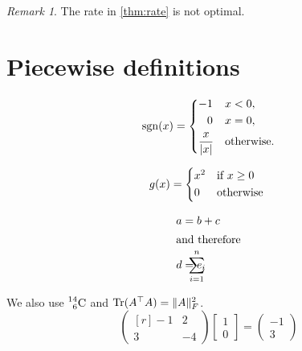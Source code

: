 \documentclass[11pt,a4paper]{article}
\DeclarePairedDelimiter{\abs}{\lvert}{\rvert}
\DeclarePairedDelimiter\norm{\lVert}{\rVert}
\DeclareMathOperator{\Tr}{Tr}
\theoremstyle{plain}
\theoremstyle{definition}
\theoremstyle{remark}
\newtheorem*{remark}{Remark}
\begin{document}
\begin{remark}
The rate in \cref{thm:rate} is not optimal.
\end{remark}

\section{Piecewise definitions}

\begin{equation}
  \operatorname{sgn}(x) = \begin{dcases}
    -1 & x < 0, \\
    \phantom{-}0 & x = 0, \\
    \frac{x}{\abs{x}} & \text{otherwise}.
  \end{dcases}
\end{equation}

\begin{equation*}
  g(x) = \begin{cases*}
    x^2 & if $x \ge 0$ \\
    0 & otherwise
  \end{cases*}
\end{equation*}

\begin{align}
  a &= b + c \\
  \shortintertext{and therefore}
  d &= \mathclap{\sum_{i=1}^{n}} e_i
\end{align}

We also use $\prescript{14}{6}{\mathrm{C}}$ and $\Tr(A^\top A) = \norm{A}_F^2$.
\begin{equation}
  \begin{pmatrix*}[r] -1 & 2 \\ 3 & -4 \end{pmatrix*}
  \begin{bmatrix} 1 \\ 0 \end{bmatrix}
  = \begin{pmatrix} -1 \\ 3 \end{pmatrix}
\end{equation}
\end{document}
